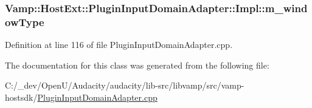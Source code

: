 \subsubsection[{\texorpdfstring{m\+\_\+window\+Type}{m_windowType}}]{ Vamp\+::\+Host\+Ext\+::\+Plugin\+Input\+Domain\+Adapter\+::\+Impl\+::m\+\_\+window\+Type\hspace{0.3cm}{\ttfamily [protected]}}\hypertarget{class_vamp_1_1_host_ext_1_1_plugin_input_domain_adapter_1_1_impl_ab1ecbd9caa24a4741ff8ebe7bafc3645}{}\label{class_vamp_1_1_host_ext_1_1_plugin_input_domain_adapter_1_1_impl_ab1ecbd9caa24a4741ff8ebe7bafc3645}


Definition at line 116 of file Plugin\+Input\+Domain\+Adapter.\+cpp.



The documentation for this class was generated from the following file\+:\begin{DoxyCompactItemize}
\item 
C\+:/\+\_\+dev/\+Open\+U/\+Audacity/audacity/lib-\/src/libvamp/src/vamp-\/hostsdk/\hyperlink{_plugin_input_domain_adapter_8cpp}{Plugin\+Input\+Domain\+Adapter.\+cpp}\end{DoxyCompactItemize}
